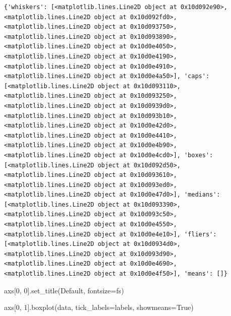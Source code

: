 \documentclass[
  letterpaper,
  DIV=11,
  numbers=noendperiod]{scrreprt}
\newenvironment{Shaded}{\begin{snugshade}}{\end{snugshade}}
\newcommand{\DecValTok}[1]{\textcolor[rgb]{0.68,0.00,0.00}{#1}}
\newcommand{\NormalTok}[1]{\textcolor[rgb]{0.00,0.23,0.31}{#1}}
\newcommand{\OperatorTok}[1]{\textcolor[rgb]{0.37,0.37,0.37}{#1}}
\newcommand{\StringTok}[1]{\textcolor[rgb]{0.13,0.47,0.30}{#1}}
\newcommand{\VariableTok}[1]{\textcolor[rgb]{0.07,0.07,0.07}{#1}}
\begin{document}
\begin{verbatim}
{'whiskers': [<matplotlib.lines.Line2D object at 0x10d092e90>, <matplotlib.lines.Line2D object at 0x10d092fd0>, <matplotlib.lines.Line2D object at 0x10d093750>, <matplotlib.lines.Line2D object at 0x10d093890>, <matplotlib.lines.Line2D object at 0x10d0e4050>, <matplotlib.lines.Line2D object at 0x10d0e4190>, <matplotlib.lines.Line2D object at 0x10d0e4910>, <matplotlib.lines.Line2D object at 0x10d0e4a50>], 'caps': [<matplotlib.lines.Line2D object at 0x10d093110>, <matplotlib.lines.Line2D object at 0x10d093250>, <matplotlib.lines.Line2D object at 0x10d0939d0>, <matplotlib.lines.Line2D object at 0x10d093b10>, <matplotlib.lines.Line2D object at 0x10d0e42d0>, <matplotlib.lines.Line2D object at 0x10d0e4410>, <matplotlib.lines.Line2D object at 0x10d0e4b90>, <matplotlib.lines.Line2D object at 0x10d0e4cd0>], 'boxes': [<matplotlib.lines.Line2D object at 0x10d092d50>, <matplotlib.lines.Line2D object at 0x10d093610>, <matplotlib.lines.Line2D object at 0x10d093ed0>, <matplotlib.lines.Line2D object at 0x10d0e47d0>], 'medians': [<matplotlib.lines.Line2D object at 0x10d093390>, <matplotlib.lines.Line2D object at 0x10d093c50>, <matplotlib.lines.Line2D object at 0x10d0e4550>, <matplotlib.lines.Line2D object at 0x10d0e4e10>], 'fliers': [<matplotlib.lines.Line2D object at 0x10d0934d0>, <matplotlib.lines.Line2D object at 0x10d093d90>, <matplotlib.lines.Line2D object at 0x10d0e4690>, <matplotlib.lines.Line2D object at 0x10d0e4f50>], 'means': []}
\end{verbatim}

\begin{Shaded}
\begin{Highlighting}[]
\NormalTok{axs[}\DecValTok{0}\NormalTok{, }\DecValTok{0}\NormalTok{].set\_title(}\StringTok{\textquotesingle{}Default\textquotesingle{}}\NormalTok{, fontsize}\OperatorTok{=}\NormalTok{fs)}

\NormalTok{axs[}\DecValTok{0}\NormalTok{, }\DecValTok{1}\NormalTok{].boxplot(data, tick\_labels}\OperatorTok{=}\NormalTok{labels, showmeans}\OperatorTok{=}\VariableTok{True}\NormalTok{)}
\end{Highlighting}
\end{Shaded}
\end{document}

